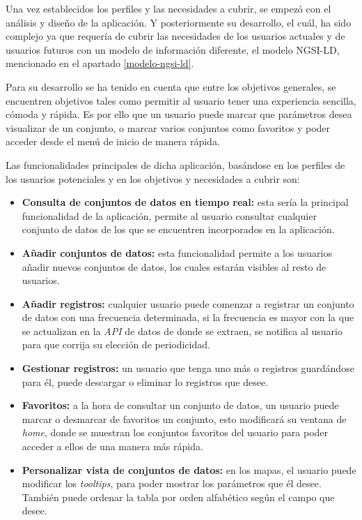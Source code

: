 Una vez establecidos los perfiles y las necesidades a cubrir, se empezó con el análisis y diseño de la aplicación. Y posteriormente su desarrollo, el cuál, ha sido complejo ya que requería de cubrir las necesidades de los usuarios actuales y de usuarios futuros con un modelo de información diferente, el modelo NGSI-LD, mencionado en el apartado \ref{modelo-ngsi-ld}.

Para su desarrollo se ha tenido en cuenta que entre los objetivos generales, se encuentren objetivos tales como permitir al usuario tener una experiencia sencilla, cómoda y rápida. Es por ello que un usuario puede marcar que parámetros desea visualizar de un conjunto, o marcar varios conjuntos como favoritos y poder acceder desde el menú de inicio de manera rápida.

Las funcionalidades principales de dicha aplicación, basándose en los perfiles de los usuarios potenciales y en los objetivos y necesidades a cubrir son:

\begin{itemize}
    \item \textbf{Consulta de conjuntos de datos en tiempo real:} esta sería la principal funcionalidad de la aplicación, permite al usuario consultar cualquier conjunto de datos de los que se encuentren incorporados en la aplicación.  
    \item \textbf{Añadir conjuntos de datos:} esta funcionalidad permite a los usuarios añadir nuevos conjuntos de datos, los cuales estarán visibles al resto de usuarios.
    \item \textbf{Añadir registros:} cualquier usuario puede comenzar a registrar un conjunto de datos con una frecuencia determinada, si la frecuencia es mayor con la que se actualizan en la \textit{API} de datos de donde se extraen, se notifica al usuario para que corrija su elección de periodicidad.
    \item \textbf{Gestionar registros:} un usuario que tenga uno más o registros guardándose para él, puede descargar o eliminar lo registros que desee.
    \item \textbf{Favoritos:} a la hora de consultar un conjunto de datos, un usuario puede marcar o desmarcar de favoritos un conjunto, esto modificará su ventana de \textit{home}, donde se muestran los conjuntos favoritos del usuario para poder acceder a ellos de una manera más rápida.
    \item \textbf{Personalizar vista de conjuntos de datos:} en los mapas, el usuario puede modificar los \textit{tooltips}, para poder mostrar los parámetros que él desee. También puede ordenar la tabla por orden alfabético según el campo que desee.
\end{itemize}

